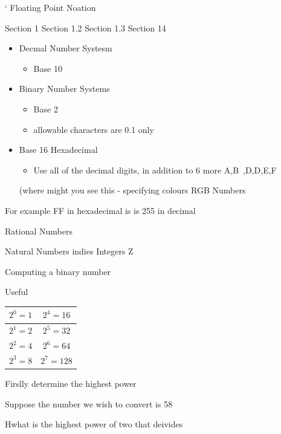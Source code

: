 \documentclass[]{report}
\begin{document}

`
Floating Point Noation

Section 1
Section 1.2
Section 1.3
Section 14

\begin{itemize}
\item Decmal Number Systesm
\begin{itemize}
\item Base 10
\end{itemize}

\item Binary Number Systems
\begin{itemize}
\item Base 2
\item allowable characters are {0.1} only
\end{itemize}
\item Base 16 Hexadecimal
\begin{itemize}
\item Use all of the decimal digits, in addition to 6 more A,B~,D,D,E,F
\end{itemize}
(where might you see this  - specifying colours RGB Numbers
\end{itemize}

For example FF in hexadecimal is is 255 in decimal 


Rational Numbers

Natural Numbers indies
Integers Z



Computing a binary number

Useful
{
\begin{center}
\begin{tabular}{|c|c|}
\hline $2^0 = 1 $ & $2^4 = 16  $ \\ 
\hline $2^1 = 2 $ & $2^5 = 32$ \\ 
\hline $2^2 = 4 $ & $2^6 = 64$ \\ 
\hline $2^3 = 8 $ & $ 2^7 = 128$ \\ 
\hline 
\end{tabular} 
\end{center}
}


\newpage




Firslly determine the highest power

Suppose the number we wish to convert is 58

Hwhat is the highest power of two that deivides
\end{document}
